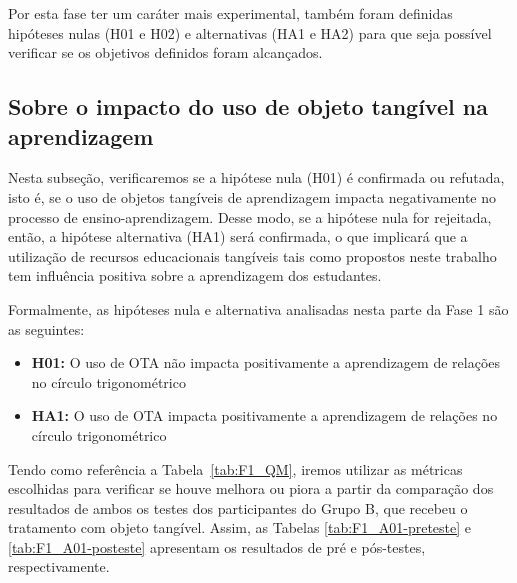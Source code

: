 

Por esta fase ter um caráter mais experimental, também foram definidas hipóteses nulas (H01 e H02) e alternativas (HA1 e HA2) para que seja possível verificar se os objetivos definidos foram alcançados.

\subsection{Sobre o impacto do uso de objeto tangível na aprendizagem}\label{subsec:fase1-H01}

Nesta subseção, verificaremos se a hipótese nula (H01) é confirmada ou refutada, isto é, se o uso de objetos tangíveis de aprendizagem impacta negativamente no processo de ensino-aprendizagem. Desse modo, se a hipótese nula for rejeitada, então, a hipótese alternativa (HA1) será confirmada, o que implicará que a utilização de recursos educacionais tangíveis tais como propostos neste trabalho tem influência positiva sobre a aprendizagem dos estudantes.

Formalmente, as hipóteses nula e alternativa analisadas nesta parte da Fase 1 são as seguintes:
\begin{itemize}
	\item \textbf{H01:} O uso de OTA não impacta positivamente a aprendizagem de relações no círculo trigonométrico
	\item \textbf{HA1:} O uso de OTA impacta positivamente a aprendizagem de relações no círculo trigonométrico
\end{itemize}

Tendo como referência a Tabela~\ref{tab:F1_QM}, iremos utilizar as métricas escolhidas para verificar se houve melhora ou piora a partir da comparação dos resultados de ambos os testes dos participantes do Grupo B, que recebeu o tratamento com objeto tangível. Assim, as Tabelas \ref{tab:F1_A01-preteste} e \ref{tab:F1_A01-posteste} apresentam os resultados de pré e pós-testes, respectivamente.

